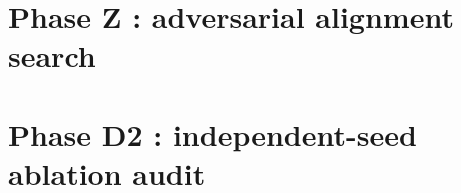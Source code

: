 \documentclass[11pt]{article}
\begin{document}


\section{Phase Z : adversarial alignment search}\label{sec:phase-z}



\section{Phase D2 : independent-seed ablation audit}\label{sec:phase-d2}


\end{document}
